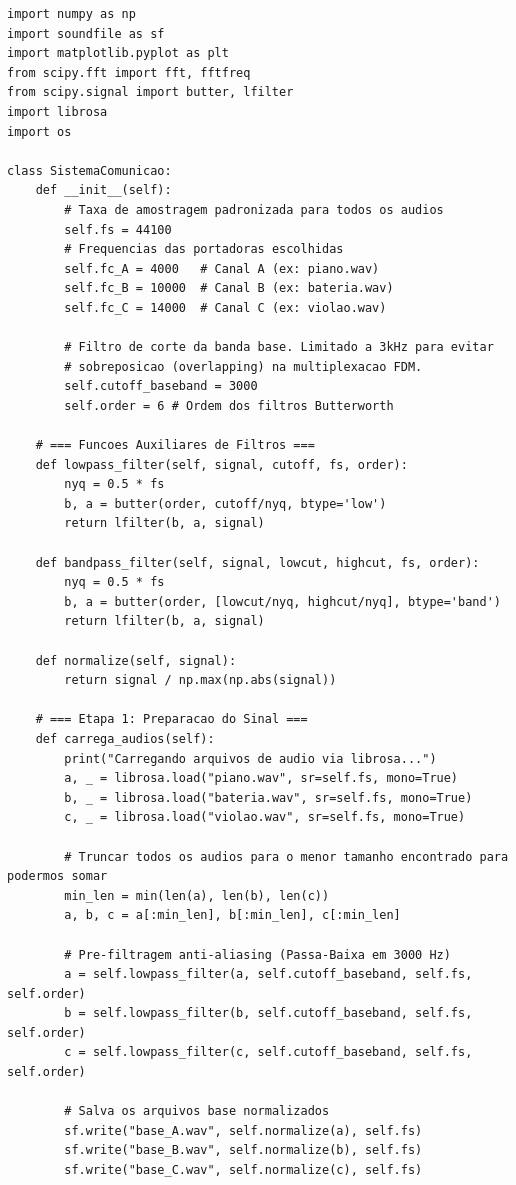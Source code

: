 \documentclass[12pt,a4paper]{article}
\begin{document}
\begin{lstlisting}
import numpy as np
import soundfile as sf
import matplotlib.pyplot as plt
from scipy.fft import fft, fftfreq
from scipy.signal import butter, lfilter
import librosa
import os

class SistemaComunicao:
    def __init__(self):
        # Taxa de amostragem padronizada para todos os audios
        self.fs = 44100 
        # Frequencias das portadoras escolhidas
        self.fc_A = 4000   # Canal A (ex: piano.wav)
        self.fc_B = 10000  # Canal B (ex: bateria.wav)
        self.fc_C = 14000  # Canal C (ex: violao.wav)
        
        # Filtro de corte da banda base. Limitado a 3kHz para evitar 
        # sobreposicao (overlapping) na multiplexacao FDM.
        self.cutoff_baseband = 3000 
        self.order = 6 # Ordem dos filtros Butterworth

    # === Funcoes Auxiliares de Filtros ===
    def lowpass_filter(self, signal, cutoff, fs, order):
        nyq = 0.5 * fs
        b, a = butter(order, cutoff/nyq, btype='low')
        return lfilter(b, a, signal)

    def bandpass_filter(self, signal, lowcut, highcut, fs, order):
        nyq = 0.5 * fs
        b, a = butter(order, [lowcut/nyq, highcut/nyq], btype='band')
        return lfilter(b, a, signal)

    def normalize(self, signal):
        return signal / np.max(np.abs(signal))

    # === Etapa 1: Preparacao do Sinal ===
    def carrega_audios(self):
        print("Carregando arquivos de audio via librosa...")
        a, _ = librosa.load("piano.wav", sr=self.fs, mono=True)
        b, _ = librosa.load("bateria.wav", sr=self.fs, mono=True)
        c, _ = librosa.load("violao.wav", sr=self.fs, mono=True)

        # Truncar todos os audios para o menor tamanho encontrado para podermos somar
        min_len = min(len(a), len(b), len(c))
        a, b, c = a[:min_len], b[:min_len], c[:min_len]

        # Pre-filtragem anti-aliasing (Passa-Baixa em 3000 Hz)
        a = self.lowpass_filter(a, self.cutoff_baseband, self.fs, self.order)
        b = self.lowpass_filter(b, self.cutoff_baseband, self.fs, self.order)
        c = self.lowpass_filter(c, self.cutoff_baseband, self.fs, self.order)

        # Salva os arquivos base normalizados
        sf.write("base_A.wav", self.normalize(a), self.fs)
        sf.write("base_B.wav", self.normalize(b), self.fs)
        sf.write("base_C.wav", self.normalize(c), self.fs)


\end{lstlisting}
\end{document}
